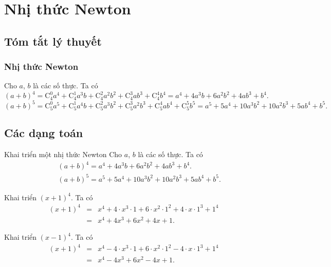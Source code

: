 ﻿\def\tenchude{NHỊ THỨC NEWTON}
\newpage\setcounter{dang}{0}
\section{Nhị thức Newton}
\subsection{Tóm tắt lý thuyết}
\subsubsection{Nhị thức Newton}
Cho $a$, $b$ là các số thực. Ta có 
$$(a+b)^4=\mathrm{C}_4^0a^4+\mathrm{C}_4^1a^{3}b+\mathrm{C}_4^2a^{2}b^2 +\mathrm{C}_4^{3}ab^{3}+\mathrm{C}_4^4b^4 = a^4+4a^3b+6a^2b^2+4ab^3+b^4.$$
$$(a+b)^5=\mathrm{C}_5^0a^5+\mathrm{C}_5^1a^{4}b+\mathrm{C}_5^2a^{3}b^2 +\mathrm{C}_5^{3}a^2b^{3}+\mathrm{C}_5^4ab^4+\mathrm{C}_5^5b^5 = a^5+5a^4+10a^3b^2+10a^2b^3+5ab^4+b^5.$$
	\subsection{Các dạng toán}	
\begin{dang}{Khai triển một nhị thức Newton}
	Cho $a$, $b$ là các số thực. Ta có 
	\begin{eqnarray*}
		&&(a+b)^4=a^4+4a^3b+6a^2b^2+4ab^3+b^4.\\&&(a+b)^5=a^5+5a^4+10a^3b^2+10a^2b^3+5ab^4+b^5.
	\end{eqnarray*}
\end{dang}
\viduminhhoa
\begin{vd}%
	Khai triển $(x+1)^4$.
	\loigiai
	{
		Ta có
		\begin{eqnarray*}
			(x+1)^4&=&x^4+4\cdot x^{3}\cdot 1+6\cdot x^{2}\cdot 1^2+4\cdot x\cdot 1^3+ 1^4\\&=&x^4+4x^3+6x^2+4x+1.
		\end{eqnarray*}
	}
\end{vd}

\begin{vd}%
	Khai triển $(x-1)^4$.
	\loigiai
	{
		Ta có
		\begin{eqnarray*}
			(x+1)^4&=&x^4-4\cdot x^{3}\cdot 1+6\cdot x^{2}\cdot 1^2-4\cdot x\cdot 1^3+ 1^4\\&=&x^4-4x^3+6x^2-4x+1.
		\end{eqnarray*}
	}
\end{vd}

